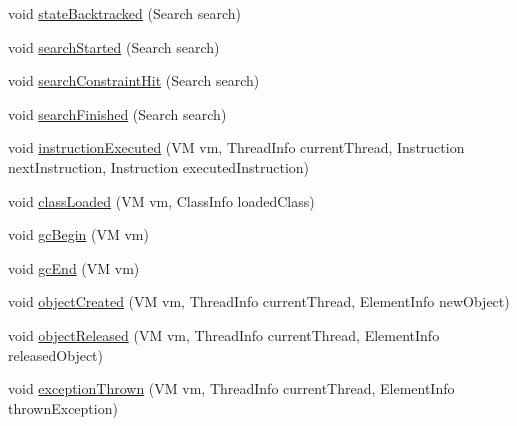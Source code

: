 \begin{DoxyCompactItemize}
\item 
void \hyperlink{classgov_1_1nasa_1_1jpf_1_1inspector_1_1server_1_1jpf_1_1_inspector_listener_mode_notifications_a33707229c3a3657b64f924e34c492220}{state\+Backtracked} (Search search)
\item 
void \hyperlink{classgov_1_1nasa_1_1jpf_1_1inspector_1_1server_1_1jpf_1_1_inspector_listener_mode_notifications_a1797ff7e26e687cc2440cc2bed63c6b9}{search\+Started} (Search search)
\item 
void \hyperlink{classgov_1_1nasa_1_1jpf_1_1inspector_1_1server_1_1jpf_1_1_inspector_listener_mode_notifications_a3e51df1ea5329cf29dfec2e7d9651dbc}{search\+Constraint\+Hit} (Search search)
\item 
void \hyperlink{classgov_1_1nasa_1_1jpf_1_1inspector_1_1server_1_1jpf_1_1_inspector_listener_mode_notifications_a50cd741925c2442f6ceb8e14c2493726}{search\+Finished} (Search search)
\item 
void \hyperlink{classgov_1_1nasa_1_1jpf_1_1inspector_1_1server_1_1jpf_1_1_inspector_listener_mode_notifications_ae3acd4952ad746d872ec8a8518078bf8}{instruction\+Executed} (VM vm, Thread\+Info current\+Thread, Instruction next\+Instruction, Instruction executed\+Instruction)
\item 
void \hyperlink{classgov_1_1nasa_1_1jpf_1_1inspector_1_1server_1_1jpf_1_1_inspector_listener_mode_notifications_a0fd53dadfb837b44551cbfeea9083121}{class\+Loaded} (VM vm, Class\+Info loaded\+Class)
\item 
void \hyperlink{classgov_1_1nasa_1_1jpf_1_1inspector_1_1server_1_1jpf_1_1_inspector_listener_mode_notifications_afa9e3264889fa585072c32e97a5bb8aa}{gc\+Begin} (VM vm)
\item 
void \hyperlink{classgov_1_1nasa_1_1jpf_1_1inspector_1_1server_1_1jpf_1_1_inspector_listener_mode_notifications_a29c03347497db8730b3160d8a25f29e1}{gc\+End} (VM vm)
\item 
void \hyperlink{classgov_1_1nasa_1_1jpf_1_1inspector_1_1server_1_1jpf_1_1_inspector_listener_mode_notifications_a803f93af31f646c3fd8b408c846cd757}{object\+Created} (VM vm, Thread\+Info current\+Thread, Element\+Info new\+Object)
\item 
void \hyperlink{classgov_1_1nasa_1_1jpf_1_1inspector_1_1server_1_1jpf_1_1_inspector_listener_mode_notifications_ab289557a81113a2441a39718e7765408}{object\+Released} (VM vm, Thread\+Info current\+Thread, Element\+Info released\+Object)
\item 
void \hyperlink{classgov_1_1nasa_1_1jpf_1_1inspector_1_1server_1_1jpf_1_1_inspector_listener_mode_notifications_a0970e3cb2d6ea586507f7cd31c2eaeed}{exception\+Thrown} (VM vm, Thread\+Info current\+Thread, Element\+Info thrown\+Exception)

\end{DoxyCompactItemize}
